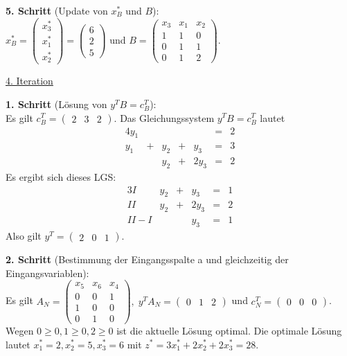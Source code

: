 \documentclass[10pt,a4paper,oneside,ngerman,numbers=noenddot]{scrartcl}
\begin{document}
		\textbf{5. Schritt} (Update von $x_{B}^{*}$ und $B$):\\
		$x_{B}^{*} = \begin{pmatrix} x_{3}^{*} \\ x_{1}^{*} \\ x_{2}^{*} \end{pmatrix} = \begin{pmatrix} 6 \\ 2 \\ 5 \end{pmatrix}$ und $B = \begin{pmatrix} x_{3} & x_{1} & x_{2} \\ 1 & 1 & 0 \\ 0 & 1 & 1 \\ 0 & 1 & 2 \end{pmatrix}$.
		
		\underline{4. Iteration}
		
		\textbf{1. Schritt} (Lösung von $y^{T}B = c_{B}^{T}$):\\
		Es gilt $c_{B}^{T} = \begin{pmatrix} 2 & 3 & 2 \end{pmatrix}$. Das Gleichungssystem $y^{T}B = c_{B}^{T}$ lautet
		\begin{alignat*}{4}
			y_{1} && && &=& 2 \\
			y_{1} &+& y_{2} &+& y_{3} &=& 3 \\
			&& y_{2} &+& 2y_{3} &=& 2
		\end{alignat*}
		Es ergibt sich dieses LGS:
		\begin{alignat*}{3}
			I & y_{2} &+& y_{3} &=& 1 \\
			II & y_{2} &+& 2y_{3} &=& 2 \\
			II - I & && y_{3} &=& 1
		\end{alignat*}
		Also gilt $y^{T} = \begin{pmatrix} 2 & 0 & 1 \end{pmatrix}$.
		
		\textbf{2. Schritt} (Bestimmung der Eingangsspalte a und gleichzeitig der Eingangsvariablen):\\
		Es gilt $A_{N} = \begin{pmatrix} x_{5} & x_{6} & x_{4} \\ 0 & 0 & 1 \\ 1 & 0 & 0 \\ 0 & 1 & 0 \end{pmatrix},\; y^{T}A_{N} = \begin{pmatrix} 0 & 1 & 2 \end{pmatrix}$ und $c_{N}^{T} = \begin{pmatrix} 0 & 0 & 0\end{pmatrix}$. Wegen $0 \geq 0, 1 \geq 0, 2 \geq 0$ ist die aktuelle Lösung optimal. Die optimale Lösung lautet $x_{1}^{*} = 2, x_{2}^{*} = 5, x_{3}^{*} = 6$ mit $z^{*} = 3x_{1}^{*} + 2x_{2}^{*} + 2x_{3}^{*} = 28$.
\end{document}
